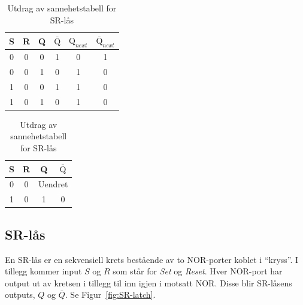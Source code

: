 \documentclass[12pt,a4paper,norsk]{article}
\begin{document}
\begin{table}[hbt!]
  \centering
  \begin{minipage}{0.55\textwidth}
    \centering
    \begin{tabular}{cccc|cc}
      \toprule
      S & R & Q & $\bar{\text{Q}}$ & $\text{Q}_{next}$ & $\bar{\text{Q}}_{next}$ \\
      \midrule
      0 & 0 & 0 & 1 & 0 & 1 \\
      0 & 0 & 1 & 0 & 1 & 0 \\
      \midrule
      1 & 0 & 0 & 1 & 1 & 0 \\
      1 & 0 & 1 & 0 & 1 & 0 \\
      \bottomrule
    \end{tabular}
    \caption{Utdrag av sannehetstabell for SR-lås\label{tab:sekvens-sannhet-vanskelig}}
  \end{minipage}
  \begin{minipage}{.4\textwidth}
    \centering
    \begin{tabular}{cc|cc}
      \toprule
      S & R & Q & $\bar{\text{Q}}$  \\
      \midrule
      0 & 0 & \multicolumn{2}{c}{Uendret} \\
      \midrule
      1 & 0 & 1 & 0 \\
      \bottomrule
    \end{tabular}
  \end{minipage}
\end{table}

\begin{center}
\end{center}

\subsection{SR-lås}
En SR-lås er en sekvensiell krets bestående av to NOR-porter koblet i ``kryss''.
I tillegg kommer input $S$ og $R$ som står for \textit{Set} og \textit{Reset}.
Hver NOR-port har output ut av kretsen i tillegg til inn igjen i motsatt NOR\@.
Disse blir SR-låsens outputs, $Q$ og $\bar{Q}$. Se Figur~\ref{fig:SR-latch}.
\end{document}
